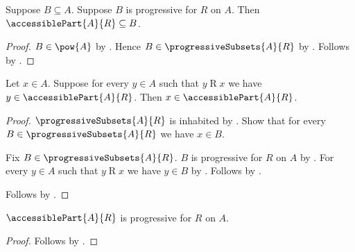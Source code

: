 \begin{proposition}\label{accessible_part_least}
    Suppose $B\subseteq A$.
    Suppose $B$ is progressive for $R$ on $A$.
    Then $\accessiblePart{A}{R}\subseteq B$.
\end{proposition}
\begin{proof}
    $B\in\pow{A}$ by .
    Hence $B\in\progressiveSubsets{A}{R}$ by .
    Follows by .
\end{proof}

\begin{proposition}\label{accessible_part_intro}
    Let $x\in A$.
    Suppose for every $y\in A$ such that $y\mathrel{R}x$
        we have $y\in\accessiblePart{A}{R}$.
    Then $x\in\accessiblePart{A}{R}$.
\end{proposition}
\begin{proof}
    $\progressiveSubsets{A}{R}$ is inhabited
        by .
    Show that for every $B\in\progressiveSubsets{A}{R}$ we have $x\in B$.
    \begin{subproof}
        Fix $B\in\progressiveSubsets{A}{R}$.
        $B$ is progressive for $R$ on $A$ by .
        For every $y\in A$ such that $y\mathrel{R}x$ we have $y\in B$
            by .
        Follows by .
    \end{subproof}
    Follows by .
\end{proof}

\begin{proposition}\label{accessible_part_is_progressive}
    $\accessiblePart{A}{R}$ is progressive for $R$ on $A$.
\end{proposition}
\begin{proof}
    Follows by .
\end{proof}

